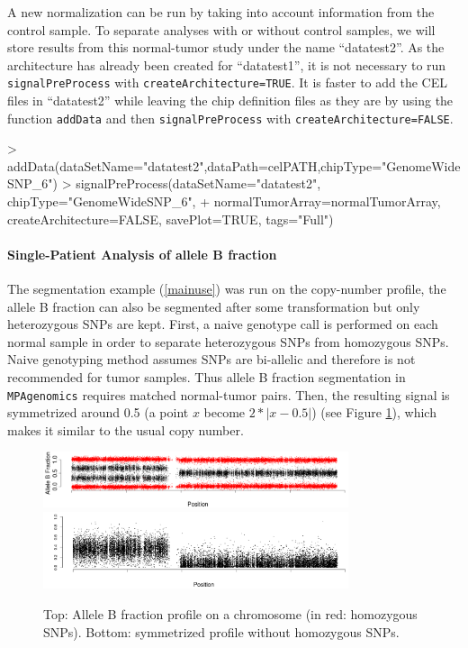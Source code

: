 \documentclass[a4paper,10pt]{article}
\begin{document}
				A new normalization can be run by taking into account information from the control sample. To separate analyses with or without control samples, we will store results from this normal-tumor study under the name ``datatest2''. As the architecture has already been created for ``datatest1'', it is not necessary to run \texttt{signalPreProcess} with \mbox{\texttt{createArchitecture=TRUE}}. It is faster to add the CEL files in ``datatest2'' while leaving the chip definition files as they are by using the function \texttt{addData} and then \texttt{signalPreProcess} with \mbox{\texttt{createArchitecture=FALSE}}.

\begin{Schunk}
\begin{Sinput}
> addData(dataSetName="datatest2",dataPath=celPATH,chipType="GenomeWideSNP_6")
> signalPreProcess(dataSetName="datatest2", chipType="GenomeWideSNP_6",
+ normalTumorArray=normalTumorArray, createArchitecture=FALSE, savePlot=TRUE, tags="Full")
\end{Sinput}
\end{Schunk}
			\paragraph{Single-Patient Analysis of allele B fraction}

				The segmentation example (\ref{mainuse}) was run on the copy-number profile, the allele B fraction can also be segmented after some transformation but only heterozygous SNPs are kept. First, a naive genotype call \cite{TumorBoost} is performed on each normal sample in order to separate heterozygous SNPs from homozygous SNPs. Naive genotyping method assumes SNPs are bi-allelic and therefore is not recommended for tumor samples. Thus allele B fraction segmentation in \texttt{MPAgenomics} requires matched normal-tumor pairs. Then, the resulting signal is symmetrized around 0.5 (a point $x$ become $2 * |x - 0.5|$) \cite{mBAF}(see Figure \ref{figsymFracB}), which makes it similar to the usual copy number.
        
				\begin{figure}[!h]
					\centering
					\includegraphics[width=0.8\textwidth]{fig/fracB}\\
					\includegraphics[width=0.8\textwidth]{fig/symFracB}
					\caption{Top: Allele B fraction profile on a chromosome (in red: homozygous SNPs). Bottom: symmetrized profile without homozygous SNPs.}
					\label{figsymFracB}
				\end{figure}
\end{document}
